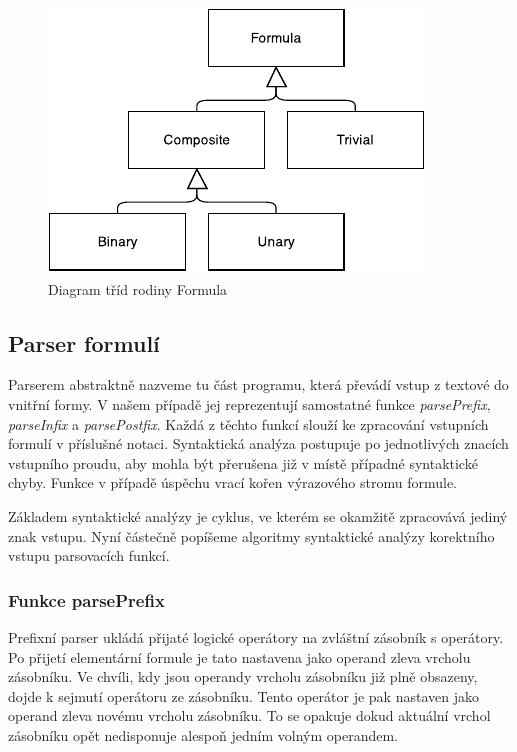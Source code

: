 \documentclass[thesis=B,czech,hidelinks]{thesis}[2012/06/26]
\begin{document}
\begin{figure}
\centering
\caption{Diagram tříd rodiny Formula}
\label{fig:formula}
\includegraphics[width=\linewidth]{diagrams/formula}
\end{figure}

\subsection{Parser formulí}

Parserem abstraktně nazveme tu část programu, která převádí vstup z textové do vnitřní formy. V našem případě jej reprezentují samostatné funkce \emph{parsePrefix}, \emph{parseInfix} a \emph{parsePostfix}. Každá z těchto funkcí slouží ke zpracování vstupních formulí v příslušné notaci. Syntaktická analýza postupuje po jednotlivých znacích vstupního proudu, aby mohla být přerušena již v místě případné syntaktické chyby. Funkce v případě úspěchu vrací kořen výrazového stromu formule.

Základem syntaktické analýzy je cyklus, ve kterém se okamžitě zpracovává jediný znak vstupu. Nyní částečně popíšeme algoritmy syntaktické analýzy korektního vstupu parsovacích funkcí.

\subsubsection{Funkce parsePrefix}

Prefixní parser ukládá přijaté logické operátory na zvláštní zásobník s operátory. Po přijetí elementární formule je tato nastavena jako operand zleva vrcholu zásobníku. Ve chvíli, kdy jsou operandy vrcholu zásobníku již plně obsazeny, dojde k sejmutí operátoru ze zásobníku. Tento operátor je pak nastaven jako operand zleva novému vrcholu zásobníku. To se opakuje dokud aktuální vrchol zásobníku opět nedisponuje alespoň jedním volným operandem.
\end{document}
